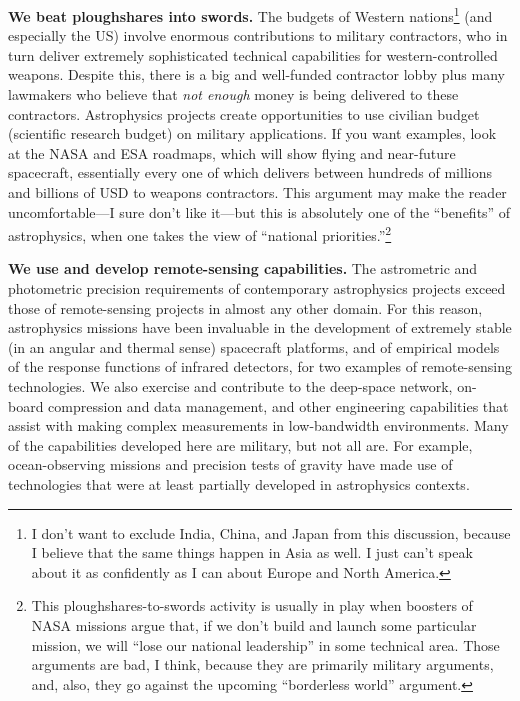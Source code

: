 \documentclass{article}
\newcommand{\paragraphskip}{\medskip}
\renewcommand{\paragraph}[1]{\par\paragraphskip\noindent\textbf{#1}}
\begin{document}
\paragraph{We beat ploughshares into swords.}
The budgets of Western nations\footnote{%
I don't want to exclude India, China, and Japan from this discussion, because I believe that the same things happen in Asia as well.
I just can't speak about it as confidently as I can about Europe and North America.}
(and especially the US) involve enormous contributions to military contractors, who in turn deliver extremely sophisticated technical capabilities for western-controlled weapons.
Despite this, there is a big and well-funded contractor lobby plus many lawmakers who believe that \emph{not enough} money is being delivered to these contractors.
Astrophysics projects create opportunities to use civilian budget (scientific research budget) on military applications.
If you want examples, look at the NASA and ESA roadmaps, which will show flying and near-future spacecraft, essentially every one of which delivers between hundreds of millions and billions of USD to weapons contractors.
This argument may make the reader uncomfortable---I sure don't like it---but this is absolutely one of the ``benefits'' of astrophysics, when one takes the view of ``national priorities.''\footnote{%
This ploughshares-to-swords activity is usually in play when boosters of NASA missions argue that, if we don't build and launch some particular mission, we will ``lose our national leadership'' in some technical area.
Those arguments are bad, I think, because they are primarily military arguments, and, also, they go against the upcoming ``borderless world'' argument.}

\paragraph{We use and develop remote-sensing capabilities.}
The astrometric and photometric precision requirements of contemporary astrophysics projects exceed those of remote-sensing projects in almost any other domain.
For this reason, astrophysics missions have been invaluable in the development of extremely stable (in an angular and thermal sense) spacecraft platforms, and of empirical models of the response functions of infrared detectors, for two examples of remote-sensing technologies.
We also exercise and contribute to the deep-space network, on-board compression and data management, and other engineering capabilities that assist with making complex measurements in low-bandwidth environments.
Many of the capabilities developed here are military, but not all are.
For example, ocean-observing missions \cite{oceanobserving} and precision tests of gravity \cite{gravityprobeb} have made use of technologies that were at least partially developed in astrophysics contexts.
\end{document}
